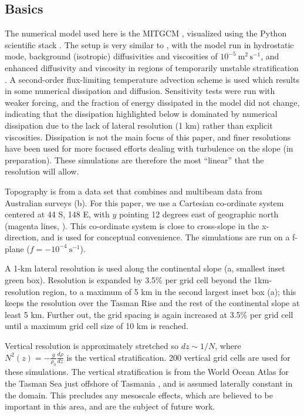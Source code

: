 \documentclass[10pt]{article}
\begin{document}
\subsection{Basics}

The numerical model used here is the MITGCM \citep{marshalletal97}, visualized using the Python scientific stack \citep{hunter07,vanderwaltetal11}. The setup is very similar to \citet{buijsmanetal14}, with the model run in hydrostatic mode, background (isotropic) diffusivities and viscosities of $10^{-5}\ \mathrm{m^2\,s^{-1}}$, and enhanced diffusivity and viscosity in regions of temporarily unstable stratification \citep{klymaklegg10}.  A second-order flux-limiting temperature advection scheme is used which results in some numerical dissipation and diffusion.  Sensitivity tests were run with weaker forcing, and the fraction of energy dissipated in the model did not change, indicating that the dissipation highlighted below is dominated by numerical dissipation due to the lack of lateral resolution (1 km) rather than explicit viscosities. Dissipation is not the main focus of this paper, and finer resolutions have been used for more focused efforts dealing with turbulence on the slope (in preparation).  These simulations are therefore the most ``linear'' that the resolution will allow.  

Topography is from a data set that combines \citet{smithsandwell97} and multibeam data from Australian surveys \citep{Whiteway09a} (b).  For this paper, we use a Cartesian co-ordinate system centered at 44 S, 148 E, with $y$ pointing 12 degrees east of geographic north (magenta lines, ).  This co-ordinate system is close to cross-slope in the x-direction, and is used for conceptual convenience.  The simulations are run on a f-plane ($f=-10^{-4}\ \mathrm{s^{-1}}$).  

A 1-km lateral resolution is used along the continental slope (a, smallest inset green box).  Resolution is expanded by 3.5\% per grid cell beyond the 1km-resolution region, to a maximum of 5 km in the second largest inset box (a); this keeps the resolution over the Tasman Rise and the rest of the continental slope at least 5 km.  Further out, the grid spacing is again increased at 3.5\% per grid cell until a maximum grid cell size of 10 km is reached.  

Vertical resolution is approximately stretched so $dz\sim 1/N$, where $N^2(z)=-\frac{g}{\rho_0}\frac{d\rho}{dz}$ is the vertical stratification.  200 vertical grid cells are used for these simulations. The vertical stratification is from the World Ocean Atlas for the Tasman Sea just offshore of Tasmania \citep{woa13}, and is assumed laterally constant in the domain.  This precludes any mesoscale effects, which are believed to be important in this area, and are the subject of future work.
\end{document}
